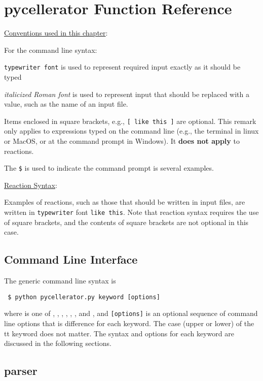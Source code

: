 \chapter[Functions]{pycellerator Function Reference}

\underline{Conventions used in this chapter}: 

For the command line syntax:

{\tt typewriter font} is used to represent required input exactly as it should be typed

\textit{italicized Roman font} is used to represent input that should be replaced with a value, such as the name of an input file.

Items enclosed in square brackets, e.g., {\tt [ like this ]} are optional. This remark only applies to expressions typed on the command line (e.g., the terminal in linux or MacOS, or at the command prompt in Windows). It \textbf{does not apply} to reactions.

The {\tt \$} is used to indicate the command prompt is several examples. 

\underline{Reaction Syntax}: 

Examples of reactions, such as those that should be written in input files, are written in {\tt typewriter} font {\tt like this}. Note that reaction syntax requires the 
use of square brackets, and the contents of square brackets are not optional in this case. 

\section{Command Line Interface}

The generic command line syntax is

\begin{lstlisting}
 $ python pycellerator.py keyword [options]
\end{lstlisting}
 
where  is one of , , , , , ,  and , and {\tt [options]} is an optional sequence of command line options that is difference for each keyword. The case (upper or lower) of the {tt keyword} does not matter. The syntax and options for each keyword are discussed in the following sections. 
 
\section{parser}

